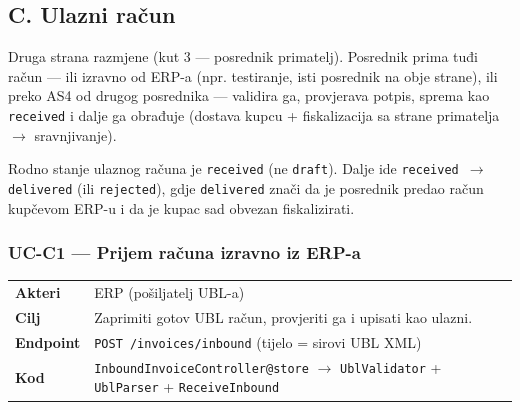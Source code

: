 \documentclass[11pt,a4paper]{article}
\renewenvironment{leftbar}{%
  \def\FrameCommand{\hspace{0pt}\vrule width 2pt\hspace{8pt}}%
  \MakeFramed{\advance\hsize-\width \FrameRestore}}%
 {\endMakeFramed}
\begin{document}
\subsection{C. Ulazni račun}

Druga strana razmjene (kut 3 — posrednik primatelj). Posrednik prima tuđi račun — ili
izravno od ERP-a (npr. testiranje, isti posrednik na obje strane), ili preko AS4
od drugog posrednika — validira ga, provjerava potpis, sprema kao \texttt{received} i dalje
ga obrađuje (dostava kupcu + fiskalizacija sa strane primatelja $\rightarrow$ sravnjivanje).

\begin{leftbar}
Rodno stanje ulaznog računa je \texttt{received} (ne \texttt{draft}). Dalje ide
\texttt{received $\rightarrow$ delivered} (ili \texttt{rejected}), gdje \texttt{delivered} znači da je posrednik predao
račun kupčevom ERP-u i da je kupac sad obvezan fiskalizirati.
\end{leftbar}

\subsubsection{UC-C1 — Prijem računa izravno iz ERP-a}

\begin{tabularx}{\textwidth}{@{}lY@{}}
\toprule
\textbf{Akteri} & ERP (pošiljatelj UBL-a) \\
\textbf{Cilj} & Zaprimiti gotov UBL račun, provjeriti ga i upisati kao ulazni. \\
\textbf{Endpoint} & \texttt{POST /invoices/inbound} (tijelo = sirovi UBL XML) \\
\textbf{Kod} & \texttt{InboundInvoiceController@store} $\rightarrow$ \texttt{UblValidator} + \texttt{UblParser} + \texttt{ReceiveInbound} \\
\bottomrule
\end{tabularx}
\end{document}
